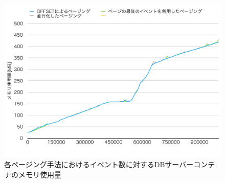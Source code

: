 \documentclass[../../../../../main]{subfiles}
\begin{document}
    \begin{figure}[H]
        \centering
        \includegraphics[width=12cm]{graph}
        \caption{各ページング手法におけるイベント数に対するDBサーバーコンテナのメモリ使用量}
        \label{fig:each-paging-db-mem-app_1_1024-db_1_1024}
    \end{figure}
\end{document}
